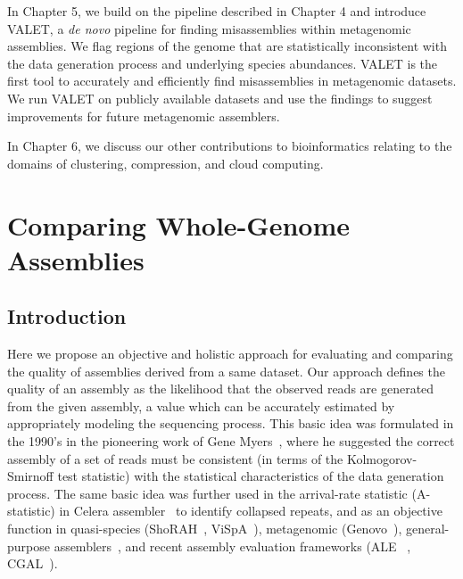 \documentclass[12pt,\mydriver]{thesis}
\begin{document}
In Chapter 5, we build on the pipeline described in Chapter 4 and introduce VALET, a \emph{de novo} pipeline for finding mis­assemblies within metagenomic assemblies.
We flag regions of the genome that are statistically inconsistent with the data generation process and underlying species abundances.
VALET is the first tool to accurately and efficiently find mis­assemblies in metagenomic datasets.
We run VALET on publicly available datasets and use the findings to suggest improvements for future metagenomic assemblers.

In Chapter 6, we discuss our other contributions to bioinformatics relating to the domains of clustering, compression, and cloud computing.
\clearpage{}
\clearpage{}
\renewcommand{\thechapter}{2}
\chapter{Comparing Whole-Genome Assemblies}

\section{Introduction}




Here we propose an objective and holistic approach for evaluating and
comparing the quality of assemblies derived from a same dataset.  Our
approach defines the quality of an assembly as the likelihood that the
observed reads are generated from the given assembly, a value which can
be accurately estimated by appropriately modeling the sequencing
process.  This basic idea was formulated in the 1990's in the
pioneering work of Gene Myers~\cite{myers1995}, where he suggested
the correct assembly of a set of reads must be consistent (in terms of
the Kolmogorov-Smirnoff test statistic) with the statistical
characteristics of the data generation process.  The same basic idea
was further used in the arrival-rate statistic (A-statistic) in Celera
assembler~\cite{CeleraAssembler} to identify collapsed repeats, and
as an objective function in quasi-species (ShoRAH~\cite{SHORAH},
ViSpA~\cite{VISPA}), metagenomic (Genovo~\cite{genovo2011}),
general-purpose assemblers~\cite{medvedev2009maximum}, and recent assembly
evaluation frameworks (ALE ~\cite{clark2013ale}, CGAL~\cite{rahman2013cgal}).
\end{document}
